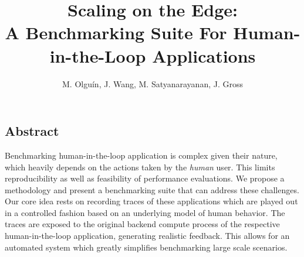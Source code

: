 \documentclass[portrait, a1]{KTHEEposter}
\begin{document}
    
    \title{\LARGE\bfseries Scaling on the Edge:\\A Benchmarking Suite For Human-in-the-Loop Applications}
    
    \author{\Large M. Olguín, J. Wang, M. Satyanarayanan, J. Gross}
    \maketitle
    
    \begin{pcolumns}[3]
        \begin{pcolumn}[2]
            \begin{pframe}[.67]
                \section{Abstract}
                Benchmarking human-in-the-loop application is complex given their nature, which heavily depends on the actions taken by the \emph{human} user.
                This limits reproducibility as well as feasibility of performance evaluations.
                We propose a methodology and present a benchmarking suite that can address these challenges.
                Our core idea rests on recording traces of these applications which are played out in a controlled fashion based on an underlying model of human behavior.
                The traces are exposed to the original backend compute process of the respective human-in-the-loop application, generating realistic feedback.
                This allows for an automated system which greatly simplifies benchmarking large scale scenarios.
            \end{pframe}
            \begin{pframe}[1.33]

\end{pframe}
\end{pcolumn}
\end{pcolumns}
\end{document}
